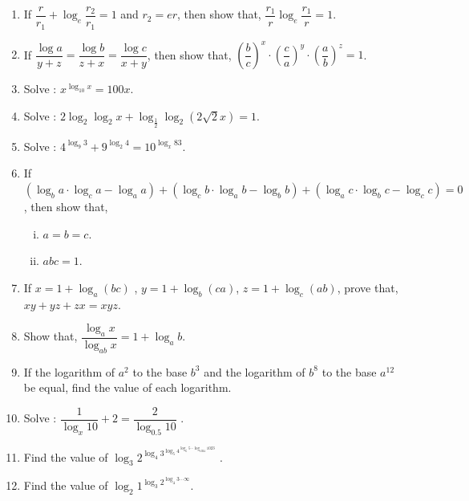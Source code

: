 \documentclass[11pt, a4paper]{article}
\begin{document}
\begin{enumerate}
     \item If $ \dfrac{r}{r_1} + \log_e \dfrac{r_2}{r_1} = 1 $ and $ r_2 = er $, then show that, $ \dfrac{r_1}{r} \log_e \dfrac{r_1}{r} = 1 $.
     
     \item If $ \dfrac{\log a}{y+z} = \dfrac{\log b}{z+x} = \dfrac{\log c}{x+y} $, then show that, $ \left( \dfrac{b}{c} \right)^x \cdot \left( \dfrac{c}{a} \right)^y \cdot \left( \dfrac{a}{b} \right)^z = 1 $.
     
     \item Solve : $ x^{\log_{10} x} = 100x $.
     
     \item Solve : $ 2\log_2 \log_2 x + \log_{\frac{1}{2}} \log_2 (2\sqrt{2}x) = 1 $.
     
     \item Solve : $ 4^{\log_9 3} + 9^{\log_2 4} = 10^{\log_x 83} $.
     
     \item If $ (\log_b a \cdot \log_c a - \log_a a) + (\log_c b \cdot \log_a b - \log_b b) + (\log_a c \cdot \log_b c - \log_c c) = 0 $, then show that, \begin{enumerate}[(i)]
     		\item $ a=b=c $.
     		\item $ abc = 1 $.
     \end{enumerate}
     
     \item If $ x = 1 + \log_a (bc) $ , $ y = 1 + \log_b (ca) $, $ z = 1 + \log_c (ab) $, prove that, $ xy + yz + zx = xyz $.
     
     \item Show that, $ \dfrac{\log_a x}{\log_{ab} x} = 1 + \log_a b $.
     
     \item If the logarithm of $a^2$ to the base $b^3$ and the logarithm of $b^8$ to the base $a^{12}$ be equal, find the value of each logarithm.
     
     \item Solve : $ \dfrac{1}{\log_x 10} + 2 = \dfrac{2}{\log_{0.5} 10} $ .   
     
     \item Find the value of $ \log_3 2^{\log_4 3^{\log_5 4^{\log_6 5 \cdots \log_{1024} 1023}}} $ 	.
     
     \item Find the value of $ \log_2 1^{\log_3 2^{\log_4 3 \cdots \infty}} $.
     	

\end{enumerate}
\end{document}
